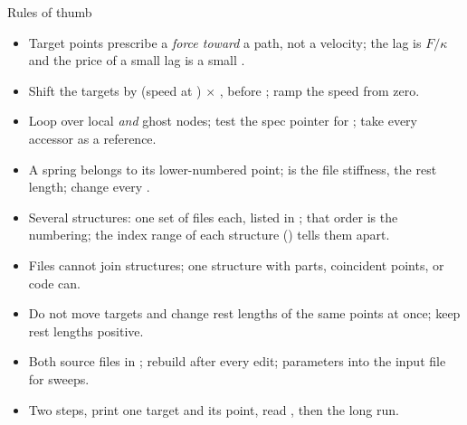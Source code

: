\documentclass[aspectratio=169,11pt]{beamer}
\begin{document}
\begin{frame}{Rules of thumb}
\label{fr:thumb}
\footnotesize
\begin{itemize}
  \item Target points prescribe a \emph{force toward} a path, not a velocity; the lag is $F/\kappa$ and the price of a small lag is a small .
  \item Shift the targets by (speed at ) $\times$ , before ; ramp the speed from zero.
  \item Loop over local \emph{and} ghost nodes; test the spec pointer for ; take every accessor as a reference.
  \item A spring belongs to its lower-numbered point;  is the file stiffness, \code{[k][1]} the rest length; change every .
  \item Several structures: one set of files each, listed in ; that order is the numbering; the index range of each structure () tells them apart.
  \item Files cannot join structures; one structure with parts, coincident points, or code can.
  \item Do not move targets and change rest lengths of the same points at once; keep rest lengths positive.
  \item Both source files in ; rebuild after every edit; parameters into the input file for sweeps.
  \item Two steps, print one target and its point, read , then the long run.
\end{itemize}
\end{frame}
\end{document}
